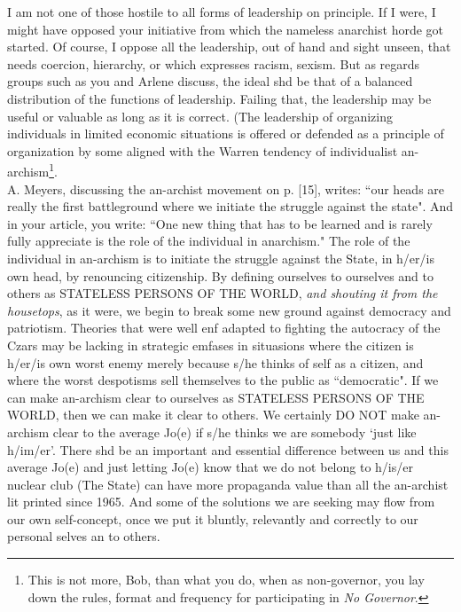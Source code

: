 \documentclass[12pt, onecolumn, letterpaper, oneside]{book}
\begin{document}
I am not one of those hostile to all forms of leadership on principle. If I were, I might have opposed your initiative from which the nameless anarchist horde got started. Of course, I oppose all the leadership, out of hand and sight unseen, that needs coercion, hierarchy, or which expresses racism, sexism. But as regards groups such as you and Arlene discuss, the ideal shd be that of a balanced distribution of the functions of leadership. Failing that, the leadership may be useful or valuable as long as it is correct. (The leadership of organizing individuals in limited economic situations is offered or defended as a principle of organization by some aligned with the Warren tendency of individualist an-archism\footnote{This is not more, Bob, than what you do, when as non-governor, you lay down the rules, format and frequency for participating in \emph{No Governor}.}.\\
A. Meyers, discussing the an-archist movement on p. [15], writes: ``our heads are really the first battleground where we initiate the struggle against the state". And in your article, you write: ``One new thing that has to be learned and is rarely fully appreciate is the role of the individual in anarchism." The role of the individual in an-archism is to initiate the struggle against the State, in h/er/is own head, by renouncing citizenship. By defining ourselves to ourselves and to others as STATELESS PERSONS OF THE WORLD, \emph{and shouting it from the housetops}, as it were, we begin to break some new ground against democracy and patriotism. Theories that were well enf adapted to fighting the autocracy of the Czars may be lacking in strategic emfases in situasions where the citizen is h/er/is own worst enemy merely because s/he thinks of self as a citizen, and where the worst despotisms sell themselves to the public as ``democratic". If we can make an-archism clear to ourselves as STATELESS PERSONS OF THE WORLD, then we can make it clear to others. We certainly DO NOT make an-archism clear to the average Jo(e) if s/he thinks we are somebody `just like h/im/er'. There shd be an important and essential difference between us and this average Jo(e) and just letting Jo(e) know that we do not belong to h/is/er nuclear club (The State) can have more propaganda value than all the an-archist lit printed since 1965. And some of the solutions we are seeking may flow from our own self-concept, once we put it bluntly, relevantly and correctly to our personal selves an to others.\\
\end{document}
